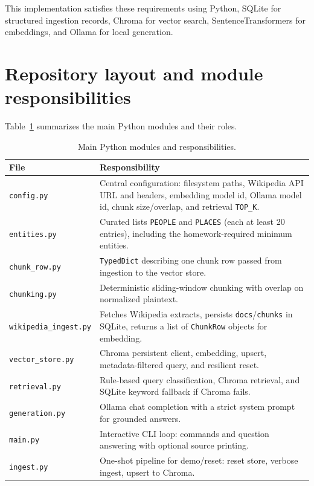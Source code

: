 \documentclass[11pt,a4paper]{article}
\begin{document}
This implementation satisfies these requirements using Python, SQLite for structured
ingestion records, Chroma for vector search, SentenceTransformers for embeddings, and
Ollama for local generation.

\section{Repository layout and module responsibilities}

Table~\ref{tab:modules} summarizes the main Python modules and their roles.

\begin{table}[h]
\centering
\begin{tabular}{@{}p{3.2cm}p{10.8cm}@{}}
\toprule
\textbf{File} & \textbf{Responsibility} \\
\midrule
\texttt{config.py} &
Central configuration: filesystem paths, Wikipedia API URL and headers, embedding model id,
Ollama model id, chunk size/overlap, and retrieval \texttt{TOP\_K}. \\
\texttt{entities.py} &
Curated lists \texttt{PEOPLE} and \texttt{PLACES} (each at least 20 entries), including the
homework-required minimum entities. \\
\texttt{chunk\_row.py} &
\texttt{TypedDict} describing one chunk row passed from ingestion to the vector store. \\
\texttt{chunking.py} &
Deterministic sliding-window chunking with overlap on normalized plaintext. \\
\texttt{wikipedia\_ingest.py} &
Fetches Wikipedia extracts, persists \texttt{docs}/\texttt{chunks} in SQLite, returns a list of
\texttt{ChunkRow} objects for embedding. \\
\texttt{vector\_store.py} &
Chroma persistent client, embedding, upsert, metadata-filtered query, and resilient reset. \\
\texttt{retrieval.py} &
Rule-based query classification, Chroma retrieval, and SQLite keyword fallback if Chroma fails. \\
\texttt{generation.py} &
Ollama chat completion with a strict system prompt for grounded answers. \\
\texttt{main.py} &
Interactive CLI loop: commands and question answering with optional source printing. \\
\texttt{ingest.py} &
One-shot pipeline for demo/reset: reset store, verbose ingest, upsert to Chroma. \\
\bottomrule
\end{tabular}
\caption{Main Python modules and responsibilities.}
\label{tab:modules}
\end{table}
\end{document}
